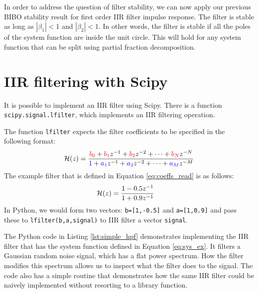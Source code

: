 In order to address the question of filter stability, we can now apply
our previous BIBO stability result for first order IIR filter impulse
response. The filter is stable as long as $|\beta_1|<1$ and
$|\beta_2|<1$. In other words, the filter is stable if all the
poles of the system function are inside the unit circle. This will hold for 
any system function that can be split using partial fraction decomposition. 

\section{IIR filtering with Scipy}

It is possible to implement an IIR filter using Scipy. There is a
function \verb|scipy.signal.lfilter|, which implements an IIR
filtering operation.

The function \verb|lfilter| expects the filter coefficients to be specified in the following format:
\begin{equation}
\mathcal{H}(z) = \frac{{\color{red}b_0} + {\color{red}b_1} z^{-1} + {\color{red}b_2} z^{-2} + \cdots 
+ {\color{red}b_N} z^{-N}}{{\color{blue}1} + {\color{blue}a_1} z^{-1} + {\color{blue}a_2} z^{-2} + \cdots + {\color{blue}a_M} z^{-M}}
\end{equation}
The example filter that is defined in Equation \ref{eq:coeffs_read} is as follows:
\begin{align}
\mathcal{H}(z) &= \frac{1-0.5z^{-1}}{1+0.9 z^{-1}}
\label{eq:sys_ex}
\end{align}
In Python, we would form two vectors: {\color{red}\verb|b=[1,-0.5]|}
and {\color{blue}\verb|a=[1,0.9]|} and pass these to \verb|lfilter(b,a,signal)| to
IIR filter a vector \verb|signal|.


The Python code in Listing \ref{lst:simple_hpf} demonstrates
implementing the IIR filter that has the system function defined in
Equation \ref{eq:sys_ex}. It filters a Gaussian random noise signal,
which has a flat power spectrum. How the filter modifies this spectrum
allows us to inspect what the filter does to the signal. The code also
has a simple routine that demonstrates how the same IIR filter could be
naively implemented without resorting to a library function.


